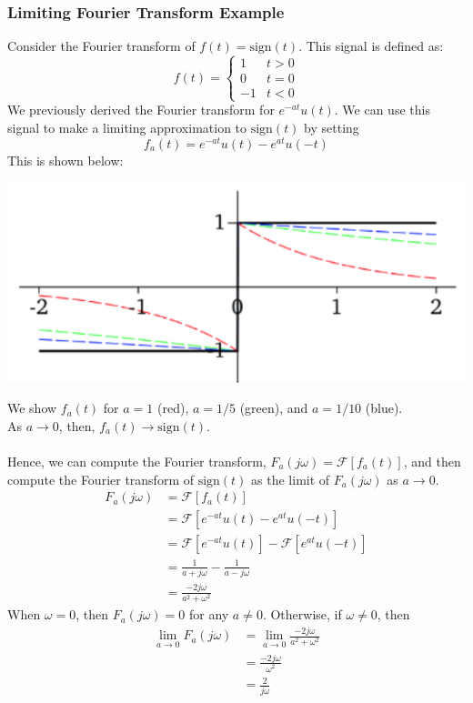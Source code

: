 \documentclass[10pt]{article}
\newcommand{\fourier}{\mathcal{F}}
\begin{document}
\subsubsection*{Limiting Fourier Transform Example}
Consider the Fourier transform of $f(t) = \text{sign}(t)$.  This signal is defined as:
\[f(t) = \begin{cases} 1 & t > 0 \\ 0 & t = 0 \\ -1 & t < 0\end{cases}\]
We previously derived the Fourier transform for $e^{-at} u(t)$.  We can use this signal to make a limiting approximation to $\text{sign}(t)$ by setting
\[f_a(t) = e^{-at} u(t) - e^{at}u(-t)\]
This is shown below:
\begin{center}
    \includegraphics[scale=1]{W7_1.png}
\end{center}
We show $f_a(t)$ for $a = 1$ (red), $a = 1/5$ (green), and $a = 1/10$ (blue).\\
As $a\rightarrow 0$, then, $f_a(t) \rightarrow \text{sign}(t)$.\\\\
Hence, we can compute the Fourier transform, $F_a(j\omega) = \fourier[f_a(t)]$, and then compute the Fourier transform of $\text{sign}(t)$ as the limit of $F_a(j\omega)$ as $a \rightarrow 0$.
\begin{align*}
    F_a(j\omega) &= \fourier[f_a(t)]\\
    &= \fourier[e^{-at} u(t) - e^{at} u(-t)]\\
    &= \fourier[e^{-at} u(t)] - \fourier[e^{at} u(-t)]\\
    &= \frac{1}{a + j\omega} - \frac{1}{a - j\omega}\\
    &= \frac{-2j\omega}{a^2 + \omega^2}
\end{align*}
When $\omega = 0$, then $F_a(j\omega) = 0$ for any $a \neq 0$.  Otherwise, if $\omega \neq 0$, then
\begin{align*}
    \lim_{a \rightarrow 0} F_a(j\omega) &= \lim_{a \rightarrow 0} \frac{-2j\omega}{a^2 + \omega^2}\\
    &= \frac{-2j\omega}{\omega^2}\\
    &= \frac{2}{j\omega}
\end{align*}
\end{document}
